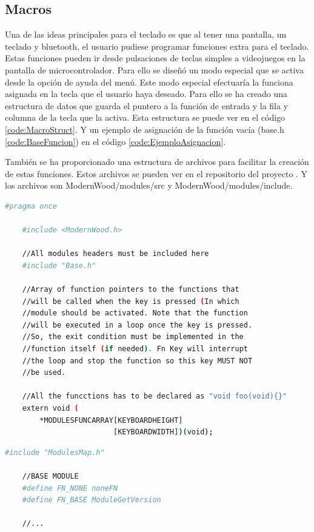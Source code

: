\subsection{Macros}\label{ApendiceMacros}

Una de las ideas principales para el teclado es que al tener una pantalla, un teclado y bluetooth, el usuario pudiese programar funciones extra para el teclado. Estas funciones pueden ir desde pulsaciones de teclas simples a videojuegos en la pantalla de microcontrolador. Para ello se diseñó un modo especial que se activa desde la opción de ayuda del menú.
Este modo especial efectuaría la funciona asignada en la tecla que el usuario haya deseado. Para ello se ha creado una estructura de datos que guarda el puntero a la función de entrada y la fila y columna de la tecla que la activa. Esta estructura se puede ver en el código \ref{code:MacroStruct}. Y un ejemplo de asignación de la función vacía (base.h \ref{code:BaseFuncion}) en el código \ref{code:EjemploAsignacion}.

También se ha proporcionado una estructura de archivos para facilitar la creación de estas funciones. Estos archivos se pueden ver en el repositorio del proyecto \cite{ModernWoodGitHub}. Y los archivos son ModernWood/modules/src y ModernWood/modules/include.

\begin{lstlisting}[style=console, language=bash, caption={Estructura que contiene las funciones en Modulesmap.h}, label={code:MacroStruct}]
    #pragma once

    #include <ModernWood.h>
    
    //All modules headers must be included here
    #include "Base.h"
    
    //Array of function pointers to the functions that 
    //will be called when the key is pressed (In which 
    //module should be activated. Note that the function 
    //will be executed in a loop once the key is pressed. 
    //So, the exit condition must be implemented in the 
    //function itself (if needed). Fn Key will interrupt 
    //the loop and stop the function so this key MUST NOT 
    //be used.

    //All the funcctions has to be declared as "void foo(void){}"
    extern void (
        *MODULESFUNCARRAY[KEYBOARDHEIGHT]
                         [KEYBOARDWIDTH])(void);
\end{lstlisting}

\begin{lstlisting}[style=console, language=bash, caption={Ejemplo de asignación a una tecla en el archivo ModernWood/modules/src/ModulesMap.cpp}, label={code:EjemploAsignacion}]
    #include "ModulesMap.h"

    //BASE MODULE
    #define FN_NONE noneFN
    #define FN_BASE ModuleGetVersion

    //...
\end{lstlisting}

